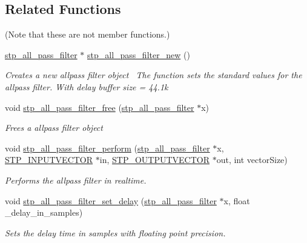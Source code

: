 \subsection*{Related Functions}
(Note that these are not member functions.) \begin{DoxyCompactItemize}
\item 
\hyperlink{structstp__all__pass__filter}{stp\+\_\+all\+\_\+pass\+\_\+filter} $\ast$ \hyperlink{structstp__all__pass__filter_a493ebb4f85e462564b6c5d9b16d827b0}{stp\+\_\+all\+\_\+pass\+\_\+filter\+\_\+new} ()
\begin{DoxyCompactList}\small\item\em Creates a new allpass filter object~\newline
 The function sets the standard values for the allpass filter. With delay buffer size = 44.\+1k ~\newline
 \end{DoxyCompactList}\item 
void \hyperlink{structstp__all__pass__filter_ac79aeee80479d21726015e5d7bf82b7a}{stp\+\_\+all\+\_\+pass\+\_\+filter\+\_\+free} (\hyperlink{structstp__all__pass__filter}{stp\+\_\+all\+\_\+pass\+\_\+filter} $\ast$x)
\begin{DoxyCompactList}\small\item\em Frees a allpass filter object~\newline
 \end{DoxyCompactList}\item 
void \hyperlink{structstp__all__pass__filter_a7401c009025defdd86c122159c7fb15c}{stp\+\_\+all\+\_\+pass\+\_\+filter\+\_\+perform} (\hyperlink{structstp__all__pass__filter}{stp\+\_\+all\+\_\+pass\+\_\+filter} $\ast$x, \hyperlink{stp__defines_8h_a142134bffa517ce86ebf0bdcdbe975d2}{S\+T\+P\+\_\+\+I\+N\+P\+U\+T\+V\+E\+C\+T\+OR} $\ast$in, \hyperlink{stp__defines_8h_a0a4fde8c3943f5267ab6f09538b3ac26}{S\+T\+P\+\_\+\+O\+U\+T\+P\+U\+T\+V\+E\+C\+T\+OR} $\ast$out, int vector\+Size)
\begin{DoxyCompactList}\small\item\em Performs the allpass filter in realtime. ~\newline
 \end{DoxyCompactList}\item 
void \hyperlink{structstp__all__pass__filter_ac8171e26fd033e188d707cf3f3354451}{stp\+\_\+all\+\_\+pass\+\_\+filter\+\_\+set\+\_\+delay} (\hyperlink{structstp__all__pass__filter}{stp\+\_\+all\+\_\+pass\+\_\+filter} $\ast$x, float \+\_\+delay\+\_\+in\+\_\+samples)
\begin{DoxyCompactList}\small\item\em Sets the delay time in samples with floating point precision. ~\newline

\end{DoxyCompactList}
\end{DoxyCompactItemize}
